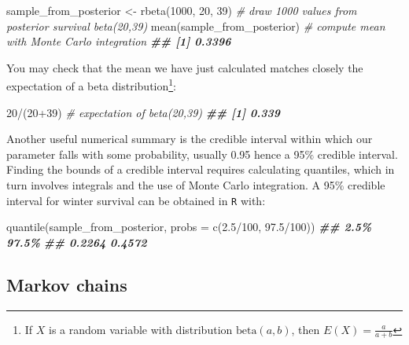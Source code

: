 \documentclass[
  12pt,
]{krantz}
\newenvironment{Shaded}{\begin{snugshade}}{\end{snugshade}}
\newcommand{\AttributeTok}[1]{\textcolor[rgb]{0.77,0.63,0.00}{#1}}
\newcommand{\CommentTok}[1]{\textcolor[rgb]{0.56,0.35,0.01}{\textit{#1}}}
\newcommand{\DecValTok}[1]{\textcolor[rgb]{0.00,0.00,0.81}{#1}}
\newcommand{\DocumentationTok}[1]{\textcolor[rgb]{0.56,0.35,0.01}{\textbf{\textit{#1}}}}
\newcommand{\FloatTok}[1]{\textcolor[rgb]{0.00,0.00,0.81}{#1}}
\newcommand{\FunctionTok}[1]{\textcolor[rgb]{0.00,0.00,0.00}{#1}}
\newcommand{\NormalTok}[1]{#1}
\newcommand{\OtherTok}[1]{\textcolor[rgb]{0.56,0.35,0.01}{#1}}
\newcommand{\SpecialCharTok}[1]{\textcolor[rgb]{0.00,0.00,0.00}{#1}}
\begin{document}
\begin{Shaded}
\begin{Highlighting}[]
\NormalTok{sample\_from\_posterior }\OtherTok{\textless{}{-}} \FunctionTok{rbeta}\NormalTok{(}\DecValTok{1000}\NormalTok{, }\DecValTok{20}\NormalTok{, }\DecValTok{39}\NormalTok{) }\CommentTok{\# draw 1000 values from posterior survival beta(20,39)}
\FunctionTok{mean}\NormalTok{(sample\_from\_posterior) }\CommentTok{\# compute mean with Monte Carlo integration}
\DocumentationTok{\#\# [1] 0.3396}
\end{Highlighting}
\end{Shaded}

You may check that the mean we have just calculated matches closely the expectation of a beta distribution\footnote{If \(X\) is a random variable with distribution \(\text{beta}(a, b)\), then \(E(X) = \displaystyle{\frac{a}{a + b}}\)}:

\begin{Shaded}
\begin{Highlighting}[]
\DecValTok{20}\SpecialCharTok{/}\NormalTok{(}\DecValTok{20}\SpecialCharTok{+}\DecValTok{39}\NormalTok{) }\CommentTok{\# expectation of beta(20,39)}
\DocumentationTok{\#\# [1] 0.339}
\end{Highlighting}
\end{Shaded}

Another useful numerical summary is the credible interval within which our parameter falls with some probability, usually 0.95 hence a 95\(\%\) credible interval. Finding the bounds of a credible interval requires calculating quantiles, which in turn involves integrals and the use of Monte Carlo integration. A 95\(\%\) credible interval for winter survival can be obtained in \texttt{R} with:

\begin{Shaded}
\begin{Highlighting}[]
\FunctionTok{quantile}\NormalTok{(sample\_from\_posterior, }\AttributeTok{probs =} \FunctionTok{c}\NormalTok{(}\FloatTok{2.5}\SpecialCharTok{/}\DecValTok{100}\NormalTok{, }\FloatTok{97.5}\SpecialCharTok{/}\DecValTok{100}\NormalTok{))}
\DocumentationTok{\#\#   2.5\%  97.5\% }
\DocumentationTok{\#\# 0.2264 0.4572}
\end{Highlighting}
\end{Shaded}

\hypertarget{markov-chains}{%
\subsection{Markov chains}\label{markov-chains}}
\end{document}
